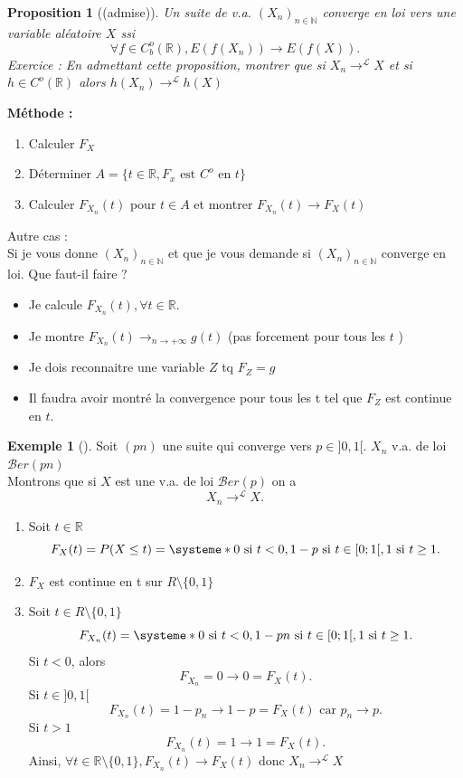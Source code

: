 \documentclass{article}
\theoremstyle{plain}%
\newtheorem{prop}[thm]{Proposition}
\theoremstyle{definition}
\newtheorem{exmp}{Exemple}[section]
\theoremstyle{remark}
\begin{document}
\begin{prop}[(admise)]
    Un suite de v.a. $ (X_n)_{n \in \mathbb{N}} $ converge en loi vers une variable aléatoire $ X $ ssi 
    \[
        \forall f \in C^o_b (\mathbb{R}), E(f(X_n)) \to E(f(X))
    .\]
    Exercice : En admettant cette proposition, montrer que si $ X_n \to ^\mathcal{L}X $ et si $ h \in C^o(\mathbb{R}) $ alors $ h(X_n) \to ^\mathcal{L} h(X) $ 
\end{prop}
\textbf{Méthode : } \begin{enumerate}
    \item Calculer $ F_X $ 
    \item Déterminer $ A=\{t \in \mathbb{R}, F_x \text{ est } C^o \text{ en } t\} $ 
    \item Calculer $ F_{X_n}(t) $ pour $ t \in A $ et montrer $ F_{X_n}(t) \to F_X(t) $ 
\end{enumerate}
Autre cas : \\
Si je vous donne $ (X_n)_{n \in \mathbb{N}} $ et que je vous demande si $ (X_n)_{n \in \mathbb{N}} $ converge en loi. Que faut-il faire ? \begin{itemize}
    \item Je calcule $ F_{X_n}(t), \forall t \in \mathbb{R}$.
    \item Je montre $ F_{X_n}(t) \to_{n \to +\infty } g(t)$ (pas forcement pour tous les $ t $ )
    \item Je dois reconnaitre une variable $ Z $ tq $ F_Z = g $ 
    \item Il faudra avoir montré la convergence pour tous les t tel que $ F_Z $ est continue en $ t $.
\end{itemize}
\begin{exmp}[]
    Soit $ (pn) $ une suite qui converge vers $ p \in ]0,1[ $. $ X_n $ v.a. de loi $ \mathcal{B}er(pn) $ \\
    Montrons que si $ X $ est une v.a. de loi $ \mathcal{B}er(p) $ on a 
    \[
        X_n \to ^\mathcal{L}X
    .\]
    \begin{enumerate}
        \item Soit $ t \in \mathbb{R} $
        \[
            F_X(t) = P(X \leq t) = \systeme*{
                0 \text{ si } t<0,
                1-p \text{ si } t \in [0;1[,
                1 \text{ si } t \geq 1
            }
        .\]
        \item $ F_X $ est continue en t sur $ R \setminus \{0,1\} $ 
        \item Soit $ t \in R \setminus \{0,1\}$ 
        \[
            F_{X_n}(t) = \systeme*{
                0 \text{ si } t<0,
                1 - pn \text{ si } t \in [0;1[,
                1 \text{ si } t \geq 1
            }
        .\]
        Si $ t < 0 $, alors 
        \[
            F_{X_n} = 0 \to 0=F_X(t)
        .\]
        Si $ t \in ]0,1[ $ 
        \[
            F_{X_n}(t) = 1-p_n \to 1-p = F_X(t) \text{ car } p_n \to p
        .\]
        Si $ t>1 $ 
        \[
            F_{X_n}(t) = 1 \to 1 = F_X(t) 
        .\]
        Ainsi, $ \forall t \in \mathbb{R}\setminus \{0,1\}, F_{X_n}(t) \to F_X(t) $ donc $ X_n \to ^\mathcal{L}X $ 
    \end{enumerate}
\end{exmp}
\end{document}
